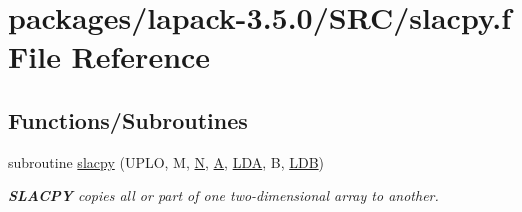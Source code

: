 \hypertarget{slacpy_8f}{}\section{packages/lapack-\/3.5.0/\+S\+R\+C/slacpy.f File Reference}
\label{slacpy_8f}
\subsection*{Functions/\+Subroutines}
\begin{DoxyCompactItemize}
\item 
subroutine \hyperlink{group__auxOTHERauxiliary_ga7780c991533ce8dd1f2c22ae2d563f08}{slacpy} (U\+P\+L\+O, M, \hyperlink{polmisc_8c_a0240ac851181b84ac374872dc5434ee4}{N}, \hyperlink{classA}{A}, \hyperlink{example__user_8c_ae946da542ce0db94dced19b2ecefd1aa}{L\+D\+A}, B, \hyperlink{example__user_8c_a50e90a7104df172b5a89a06c47fcca04}{L\+D\+B})
\begin{DoxyCompactList}\small\item\em {\bfseries S\+L\+A\+C\+P\+Y} copies all or part of one two-\/dimensional array to another. \end{DoxyCompactList}\end{DoxyCompactItemize}
